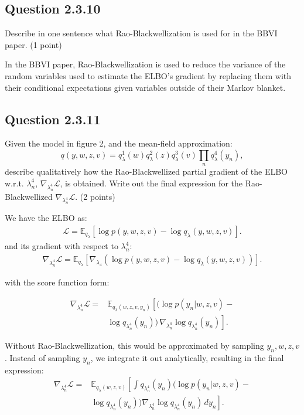 \documentclass{article}
\begin{document}
\begin{multicols}{2}
    \subsection*{Question 2.3.10}
    Describe in one sentence what Rao-Blackwellization is used for in the BBVI paper. (1 point)\bigskip 

    In the BBVI paper, Rao-Blackwellization is used to reduce the variance of the random variables used to estimate the ELBO's gradient by replacing them with their conditional expectations given variables outside of their Markov blanket.


    \subsection*{Question 2.3.11}
    Given the model in figure 2, and the mean-field approximation:  
    \[
    q(y, w, z, v) = q_\lambda^1(w)q_\lambda^2(z)q_\lambda^3(v)\prod_n q_\lambda^4(y_n),
    \]
    describe qualitatively how the Rao-Blackwellized partial gradient of the ELBO w.r.t. \(\lambda_n^4\), \(\nabla_{\lambda_n^4} \mathcal{L}\), is obtained. Write out the final expression for the Rao-Blackwellized \(\nabla_{\lambda_n^4} \mathcal{L}\). (2 points)\bigskip

    We have the ELBO as:
    \begin{align*}
        \mathcal{L} = \mathbb{E}_{q_\lambda}\left[\log p(y, w, z, v) - \log q_\lambda(y, w, z, v)\right].
    \end{align*}
    and its gradient with respect to \(\lambda_n^4\):
    \begin{align*}
        \nabla_{\lambda_n^4}\mathcal{L} = \mathbb{E}_{q_\lambda}\left[\nabla_{\lambda_4}(\log p(y, w, z, v) - \log q_\lambda(y, w, z, v))\right].
    \end{align*}

    with the score function form:

    \begin{align*}
        \nabla_{\lambda_n^4}\mathcal{L} =& \mathbb{E}_{q_\lambda(w,z,v,y_n)}\left[(\log p(y_n|w,z,v)-\right.\\&\left.\log q_{\lambda_n^4}(y_n))\,\nabla_{\lambda_n^4}\log q_{\lambda_n^4}(y_n)\right].
    \end{align*}

    Without Rao-Blackwellization, this would be approximated by sampling $y_n, w,z,v$.
    Instead of sampling $y_n$, we integrate it out analytically, resulting in the final expression:
    \begin{align*}
        \nabla_{\lambda_n^4}\mathcal{L} 
        =& \mathbb{E}_{q_\lambda(w,z,v)}\left[\int q_{\lambda_n^4}(y_n) (\log p(y_n|w,z,v)-\right.\\&\left.\log q_{\lambda_n^4}(y_n)) \nabla_{\lambda_n^4}\log q_{\lambda_n^4}(y_n)\,dy_n\right].
    \end{align*}




\end{multicols}

\clearpage
{}
\printbibliography{}
\end{document}
